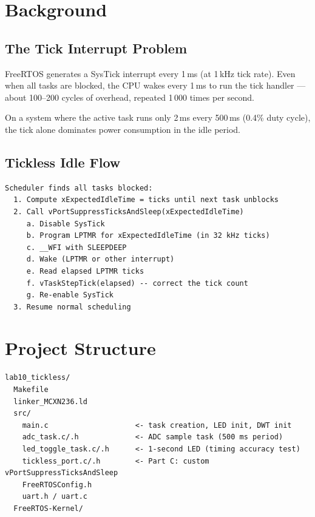 \documentclass[11pt, a4paper]{article}
\begin{document}
\section{Background}

\subsection{The Tick Interrupt Problem}

FreeRTOS generates a SysTick interrupt every 1\,ms (at 1\,kHz tick rate). Even when all
tasks are blocked, the CPU wakes every 1\,ms to run the tick handler --- about 100--200
cycles of overhead, repeated 1\,000 times per second.

On a system where the active task runs only 2\,ms every 500\,ms (0.4\% duty cycle), the
tick alone dominates power consumption in the idle period.

\subsection{Tickless Idle Flow}

\begin{lstlisting}[style=textstyle]
Scheduler finds all tasks blocked:
  1. Compute xExpectedIdleTime = ticks until next task unblocks
  2. Call vPortSuppressTicksAndSleep(xExpectedIdleTime)
     a. Disable SysTick
     b. Program LPTMR for xExpectedIdleTime (in 32 kHz ticks)
     c. __WFI with SLEEPDEEP
     d. Wake (LPTMR or other interrupt)
     e. Read elapsed LPTMR ticks
     f. vTaskStepTick(elapsed) -- correct the tick count
     g. Re-enable SysTick
  3. Resume normal scheduling
\end{lstlisting}

\section{Project Structure}

\begin{lstlisting}[style=textstyle]
lab10_tickless/
  Makefile
  linker_MCXN236.ld
  src/
    main.c                    <- task creation, LED init, DWT init
    adc_task.c/.h             <- ADC sample task (500 ms period)
    led_toggle_task.c/.h      <- 1-second LED (timing accuracy test)
    tickless_port.c/.h        <- Part C: custom vPortSuppressTicksAndSleep
    FreeRTOSConfig.h
    uart.h / uart.c
  FreeRTOS-Kernel/
\end{lstlisting}
\end{document}

